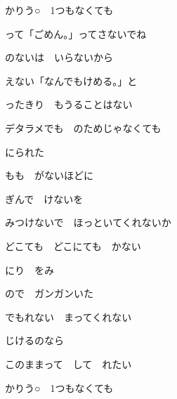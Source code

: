 \documentclass[a4paper,tate,twocolumn,12pt]{ltjtarticle}
\begin{document}
\begin{flushleft}
\begin{minipage}{\linewidth}
かりう○　1つもなくても

って「ごめん。」ってさないでね

のないは　いらないから
\end{minipage}

\vspace{3em}

\noindent\begin{minipage}{\linewidth}
えない「なんでもけめる。」と

ったきり　もうることはない

デタラメでも　のためじゃなくても

にられた
\end{minipage}

\vspace{2em}

\noindent\begin{minipage}{\linewidth}
もも　がないほどに

ぎんで　けないを

みつけないで　ほっといてくれないか

どこても　どこにても　かない
\end{minipage}

\vspace{2em}

\noindent\begin{minipage}{\linewidth}
にり　をみ

ので　ガンガンいた

でもれない　まってくれない

じけるのなら
\end{minipage}

\vspace{2em}

\noindent\begin{minipage}{\linewidth}
このままって　して　れたい

かりう○　1つもなくても


\end{minipage}
\end{flushleft}
\end{document}
